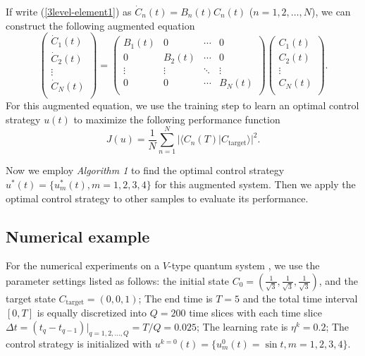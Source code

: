 \documentclass[letterpaper, 10 pt, conference]{ieeeconf}
\begin{document}
If write (\ref{3level-element1}) as
$\dot{C}_{n}(t)=B_{n}(t)C_{n}(t)$ ($n=1,2,\ldots, N$), we can
construct the following augmented equation
\begin{equation}\label{augmented-equation-5samples3level}
\left(\begin{array}{c}
  \dot{C}_{1}(t) \\
  \dot{C}_{2}(t) \\
  \vdots \\
  \dot{C}_{N}(t) \\
\end{array}\right)=
\left(\begin{array}{cccc}
  B_{1}(t) & 0 & \cdots & 0  \\
  0 & B_{2}(t) & \cdots & 0  \\
  \vdots & \vdots & \ddots & \vdots  \\
  0 & 0 & \cdots & B_{N}(t)  \\
\end{array}\right) \left(\begin{array}{c}
  C_{1}(t) \\
  C_{2} (t)\\
  \vdots \\
  C_{N} (t)\\
\end{array}\right).
\end{equation}
For this augmented equation, we use the training step to learn
an optimal control strategy $u(t)$ to maximize the following
performance function
\begin{equation}
J(u)=\frac{1}{N}\sum_{n=1}^{N}\vert \langle
C_{n}(T)|C_{\text{target}}\rangle\vert^{2}.
\end{equation}

Now we employ \emph{Algorithm 1} to find the optimal control strategy
$u^{*}(t)=\{u^{*}_{m}(t), m=1,2,3,4\}$ for this augmented
system. Then we apply the optimal control strategy to other
samples to evaluate its performance.


\subsection{Numerical example}
For the numerical experiments on a $V$-type quantum system \cite{You and Nori 2011},
we use the parameter settings listed as follows: the initial state
$C_{0}=(\frac{1}{\sqrt{3}},\frac{1}{\sqrt{3}},\frac{1}{\sqrt{3}})$,
and the target state $C_{\text{target}}=(0,0,1)$; The end time is $T=5$
and the total time interval $[0,T]$ is equally discretized into
$Q=200$ time slices with each time slice $\Delta
t=(t_{q}-t_{q-1})|_{q=1,2,\ldots,Q}=T/Q=0.025$; The learning rate is
$\eta^{k}=0.2$; The control
strategy is initialized with $u^{k=0}(t)=\{u^{0}_{m}(t)=\sin t,
m=1,2,3,4 \}$.
\end{document}
